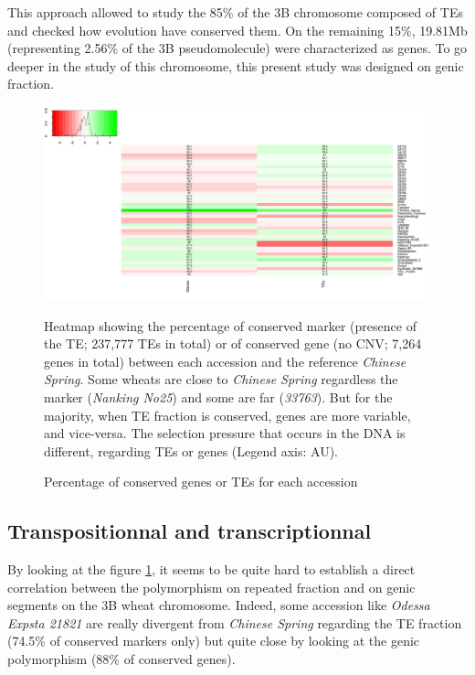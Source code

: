 \documentclass[a4paper, 12pt]{article}
\begin{document}
\begin{onehalfspace}
This approach allowed to study the 85\% of the 3B chromosome composed of TEs and checked how evolution have conserved them. On the remaining 15\%, 19.81Mb (representing 2.56\% of the 3B pseudomolecule) were characterized as genes. To go deeper in the study of this chromosome, this present study was designed on genic fraction.

\newpage %
\thispagestyle{empty}
        \begin{figure} 	
          \centering \includegraphics[scale=0.28]{Figures/Figure_24.jpg}
          \vspace{0.5cm}
          \caption{Percentage of conserved genes or TEs for each accession} 
          \label{fig:F24}
        \footnotesize{Heatmap showing the percentage of conserved marker (presence of the TE; 237,777 TEs in total) or of conserved gene (no CNV; 7,264 genes in total) between each accession and the reference \textit{Chinese Spring}. Some wheats are close to \textit{Chinese Spring} regardless the marker (\textit{Nanking No25}) and some are far (\textit{33763}). But for the majority, when TE fraction is conserved, genes are more variable, and vice-versa. The selection pressure that occurs in the DNA is different, regarding TEs or genes (Legend axis: AU).}
        \end{figure}
\addtocounter{page}{-1}
\newpage
\clearpage %

        \subsection{Transpositionnal and transcriptionnal}
        
By looking at the figure \ref{fig:F24}, it seems to be quite hard to establish a direct correlation between the polymorphism on repeated fraction and on genic segments on the 3B wheat chromosome. Indeed, some accession like \textit{Odessa Expsta 21821} are really divergent from \textit{Chinese Spring} regarding the TE fraction (74.5\% of conserved markers only) but quite close by looking at the genic polymorphism (88\% of conserved genes).


\end{onehalfspace}
\end{document}

